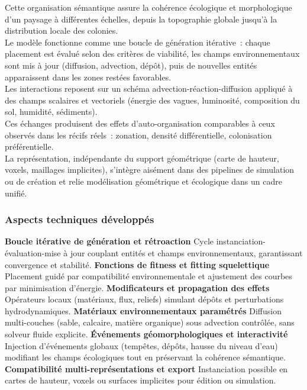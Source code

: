 Cette organisation sémantique assure la cohérence écologique et morphologique d'un paysage à différentes échelles, depuis la topographie globale jusqu'à la distribution locale des colonies. \\
Le modèle fonctionne comme une boucle de génération itérative~: chaque placement est évalué selon des critères de viabilité, les champs environnementaux sont mis à jour (diffusion, advection, dépôt), puis de nouvelles entités apparaissent dans les zones restées favorables. \\
Les interactions reposent sur un schéma advection-réaction-diffusion appliqué à des champs scalaires et vectoriels (énergie des vagues, luminosité, composition du sol, humidité, sédiments). \\
Ces échanges produisent des effets d'auto-organisation comparables à ceux observés dans les récifs réels~: zonation, densité différentielle, colonisation préférentielle. \\
La représentation, indépendante du support géométrique (carte de hauteur, voxels, maillages implicites), s'intègre aisément dans des pipelines de simulation ou de création et relie modélisation géométrique et écologique dans un cadre unifié.

\subsubsection*{Aspects techniques développés}
\begin{Itemize}
    \Item{} \textbf{Boucle itérative de génération et rétroaction} Cycle instanciation-évaluation-mise à jour couplant entités et champs environnementaux, garantissant convergence et stabilité.
    \Item{} \textbf{Fonctions de fitness et fitting squelettique} Placement guidé par compatibilité environnementale et ajustement des courbes par minimisation d'énergie.
    \Item{} \textbf{Modificateurs et propagation des effets} Opérateurs locaux (matériaux, flux, reliefs) simulant dépôts et perturbations hydrodynamiques.
    \Item{} \textbf{Matériaux environnementaux paramétrés} Diffusion multi-couches (sable, calcaire, matière organique) sous advection contrôlée, sans solveur fluide explicite.
    \Item{} \textbf{Événements géomorphologiques et interactivité} Injection d'événements globaux (tempêtes, dépôts, hausse du niveau d'eau) modifiant les champs écologiques tout en préservant la cohérence sémantique.
    \Item{} \textbf{Compatibilité multi-représentations et export} Instanciation possible en cartes de hauteur, voxels ou surfaces implicites pour édition ou simulation.
\end{Itemize}


